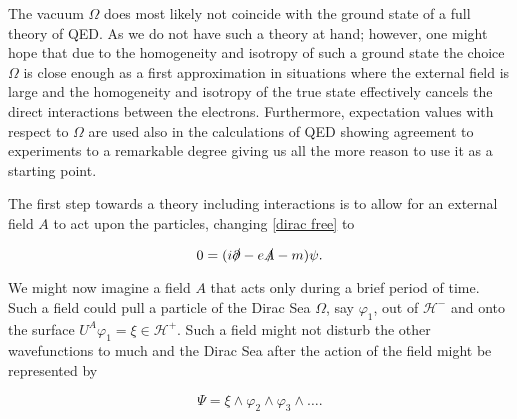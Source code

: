 \documentclass[b5paper,draft,openbib,12pt]{memoir}
\begin{document}
The vacuum \(\Omega\) does most likely not coincide with the 
ground state of a full theory of QED. As we do not have 
such a theory at hand; 
however, one might hope that due to the homogeneity and isotropy 
of such a ground state the choice \(\Omega\) is close enough as a
first approximation in situations where the external field is large 
and the homogeneity and isotropy of the true state 
effectively cancels the direct 
interactions between the electrons.  Furthermore, 
expectation values with respect to \(\Omega\) are 
used also in the
calculations of QED showing agreement to experiments to a remarkable 
degree giving us all the more reason to use it as a starting point. 

The first step towards a theory including interactions is to allow 
for an external field \(A\) to act upon the particles, changing 
\eqref{dirac free} to

\begin{equation}\label{dirac ext field}
  0= (i\slashed{\partial}-e\slashed{A}-m ) \psi.
\end{equation}

We might now imagine a field \(A\) that acts only during a 
brief period of time. Such a field could pull a particle 
of the Dirac Sea \(\Omega\), say 
\(\varphi_1\), out of \(\mathcal{H}^-\) and  
onto the surface \(U^A \varphi_1=\xi \in \mathcal{H}^+\).
Such a field might not disturb the other wavefunctions to much 
and the Dirac Sea after the action of the field might be 
represented by 

\begin{equation}\label{toy example dirac sea}
  \Psi= \xi\wedge \varphi_2\wedge \varphi_3 \wedge \dots.
\end{equation}
\end{document}
